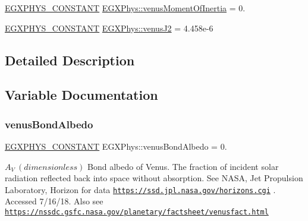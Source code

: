\begin{DoxyCompactItemize}
\mbox{\hyperlink{group___e_g_x_phys-_constants-_macros_ga76980d288494ce1714c9ac68a95ba702}{E\+G\+X\+P\+H\+Y\+S\+\_\+\+C\+O\+N\+S\+T\+A\+NT}} \mbox{\hyperlink{group___e_g_x_phys-_constants-_astrophysics-_solar_system-_venus-_bulk_gaa3f5213a60c6dfeaf8bd4a770783cd31}{E\+G\+X\+Phys\+::venus\+Moment\+Of\+Inertia}} = 0.
\item 
\mbox{\hyperlink{group___e_g_x_phys-_constants-_macros_ga76980d288494ce1714c9ac68a95ba702}{E\+G\+X\+P\+H\+Y\+S\+\_\+\+C\+O\+N\+S\+T\+A\+NT}} \mbox{\hyperlink{group___e_g_x_phys-_constants-_astrophysics-_solar_system-_venus-_bulk_ga7cb8b494f46eb7bdf8bbe4a4d61bb53e}{E\+G\+X\+Phys\+::venus\+J2}} = 4.\+458e-\/6
\end{DoxyCompactItemize}


\subsection{Detailed Description}


\subsection{Variable Documentation}
\mbox{\label{group___e_g_x_phys-_constants-_astrophysics-_solar_system-_venus-_bulk_ga95cf1b62650a9263f49fac0123769aab}} 
\subsubsection{\texorpdfstring{venus\+Bond\+Albedo}{venusBondAlbedo}}
{\footnotesize\ttfamily \mbox{\hyperlink{group___e_g_x_phys-_constants-_macros_ga76980d288494ce1714c9ac68a95ba702}{E\+G\+X\+P\+H\+Y\+S\+\_\+\+C\+O\+N\+S\+T\+A\+NT}} E\+G\+X\+Phys\+::venus\+Bond\+Albedo = 0.}

$ A_{V} \ (dimensionless)$ Bond albedo of Venus. The fraction of incident solar radiation reflected back into space without absorption. See N\+A\+SA, Jet Propulsion Laboratory, Horizon for data \href{https://ssd.jpl.nasa.gov/horizons.cgi}{\tt https\+://ssd.\+jpl.\+nasa.\+gov/horizons.\+cgi} . Accessed 7/16/18. Also see \href{https://nssdc.gsfc.nasa.gov/planetary/factsheet/venusfact.html}{\tt https\+://nssdc.\+gsfc.\+nasa.\+gov/planetary/factsheet/venusfact.\+html} \mbox{\label{group___e_g_x_phys-_constants-_astrophysics-_solar_system-_venus-_bulk_gac9827d3838ac8fcd5b4d01df3ac85d01}} 
